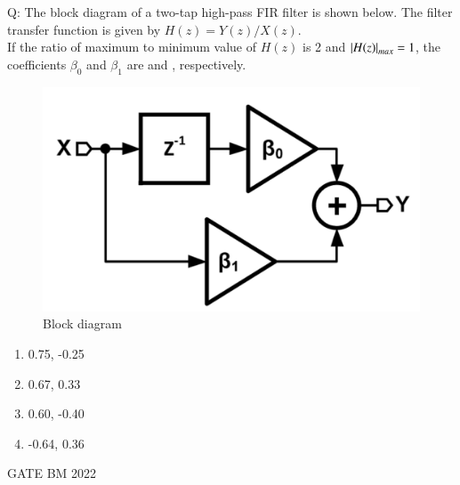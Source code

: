 \documentclass[journal,12pt,onecolumn]{IEEEtran}
\theoremstyle{remark}
\begin{document}
\let\vec\mathbf







\bigskip


Q:  The block diagram of a two-tap high-pass FIR filter is shown below. The filter transfer function is given by $H(z) = Y(z)/X(z)$.\\
If the ratio of maximum to minimum value of $H(z)$ is 2 and $\left\vert H(z)\right\vert_{max} = 1$, the coefficients $\beta_0$ and $\beta_1$ are \underline{\hspace{3cm}} and \underline{\hspace{3cm}}, respectively. 

\begin{figure}[H]
    \centering
    \includegraphics[width=0.5\linewidth]{figs/qfig.png} 
    \caption{Block diagram}
    \label{fig:GATE23BM39.1}
\end{figure}


\begin{enumerate}[label=(\Alph*)]
\item 0.75, -0.25
\item 0.67, 0.33
\item 0.60, -0.40
\item -0.64, 0.36
\end{enumerate}
\hfill{GATE BM 2022}


\solution \\
\end{document}
